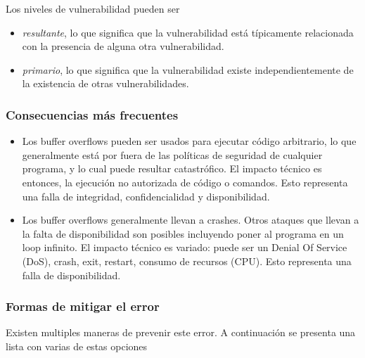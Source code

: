 Los niveles de vulnerabilidad pueden ser

\begin{itemize}
    \item \textit{resultante}, lo que significa que la vulnerabilidad está típicamente relacionada con la presencia de alguna otra vulnerabilidad.
    \item \textit{primario}, lo que significa que la vulnerabilidad existe independientemente de la existencia de otras vulnerabilidades.
\end{itemize}

\subsubsection{Consecuencias más frecuentes}

\begin{itemize}
    \item Los buffer overflows pueden ser usados para ejecutar código arbitrario, lo que generalmente está por fuera de las políticas de seguridad de cualquier programa,
     y lo cual puede resultar catastrófico. El impacto técnico es entonces, la ejecución no autorizada de código o comandos. Esto representa una falla de integridad,
    confidencialidad y disponibilidad.
    \item Los buffer overflows generalmente llevan a crashes. Otros ataques que llevan a la falta de disponibilidad son posibles incluyendo poner al programa en un loop infinito.
    El impacto técnico es variado: puede ser un Denial Of Service (DoS), crash, exit, restart, consumo de recursos (CPU). Esto representa una falla de disponibilidad.
\end{itemize}

\subsubsection{Formas de mitigar el error}

Existen multiples maneras de prevenir este error. A continuación se presenta una lista con varias de estas opciones

